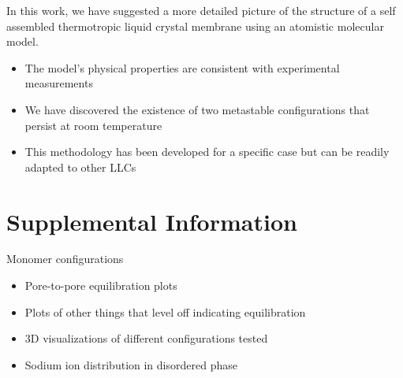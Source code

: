 \documentclass{article}
\begin{document}
	In this work, we have suggested a more detailed picture of the structure of a self assembled thermotropic liquid crystal membrane using an atomistic molecular model.
	\begin{itemize}
		\item The model's physical properties are consistent with experimental measurements
		\item We have discovered the existence of two metastable configurations that persist at room temperature
		\item This methodology has been developed for a specific case but can be readily adapted to other LLCs
	\end{itemize}

	\section{Supplemental Information} %
	
	Monomer configurations
	\begin{itemize}
		\item Pore-to-pore equilibration plots
		\item Plots of other things that level off indicating equilibration
		\item 3D visualizations of different configurations tested
		\item Sodium ion distribution in disordered phase
	\end{itemize}
	
\end{document}
